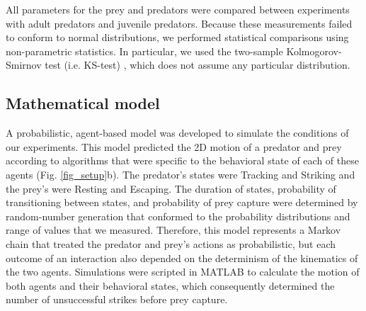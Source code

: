 \documentclass[]{rsos}%
\begin{document}
All parameters for the prey and predators were compared between experiments with adult predators and juvenile predators.
Because these measurements failed to conform to normal distributions, we performed statistical comparisons using non-parametric statistics.
In particular, we used the two-sample Kolmogorov-Smirnov test (i.e. KS-test) \cite{MasseyJr:1951jo}, which does not assume any particular distribution. 


\subsection{Mathematical model}
A probabilistic, agent-based model was developed to simulate the conditions of our experiments. 
This model predicted the 2D motion of a predator and prey \cite{Isaacs:1965uz} according to algorithms that were specific to the behavioral state of each of these agents (Fig. \ref{fig_setup}b). 
The predator's states were Tracking and Striking and the prey's were Resting and Escaping. 
The duration of states, probability of transitioning between states, and probability of prey capture were determined by random-number generation that conformed to the probability distributions and range of values that we measured.
Therefore, this model represents a Markov chain that treated the predator and prey's actions as probabilistic, but each outcome of an interaction also depended on the determinism of the kinematics of the two agents.
Simulations were scripted in MATLAB to calculate the motion of both agents and their behavioral states, which consequently determined the number of unsuccessful strikes before prey capture.
\end{document}
